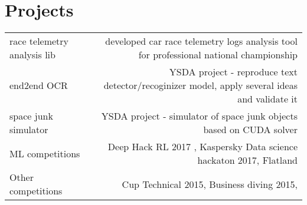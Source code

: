 \section*{Projects}
\vspace{-0.5em}
\begin{tabular}{@{}L!{\VRule}R}
    race telemetry analysis lib & developed car race telemetry logs analysis tool for professional national championship        \\
    end2end OCR                 & YSDA project - reproduce text detector/recoginizer model, apply several ideas and validate it \\
    space junk simulator        & YSDA project - simulator of space junk objects based on CUDA solver                           \\
    ML competitions             & Deep Hack RL 2017 , Kaspersky Data science hackaton 2017, Flatland                            \\
    Other competitions          & Cup Technical 2015, Business diving 2015,
\end{tabular}